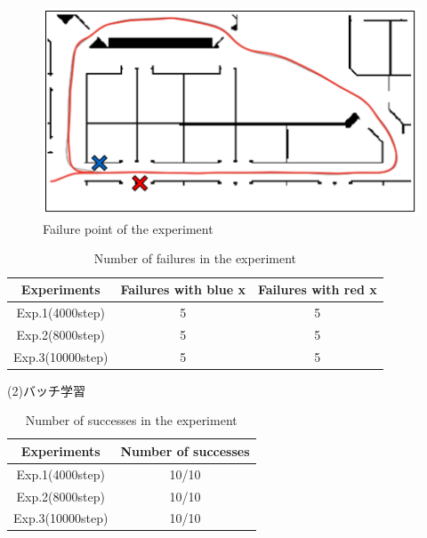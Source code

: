 \begin{figure}[h]
  \centering
  \includegraphics[keepaspectratio, scale=0.5]{images/result2.png}
  \caption{Failure point of the experiment}
  \label{Fig:result2.1}
  \end{figure}

\begin{table}[h]
  \centering
  \begin{tabular}{|c|c|c|} \hline
    Experiments & Failures with blue x & Failures with red x \\ \hline
    Exp.1(4000step) & 5 & 5 \\ \hline
    Exp.2(8000step) & 5 & 5 \\ \hline
    Exp.3(10000step) & 5 & 5 \\ \hline
  \end{tabular}
  \caption{Number of failures in the experiment}
  \label{tb:fail2.1}
\end{table}

\newpage
\begin{description}
  \item [(2)バッチ学習]
\end{description}
\begin{table}[h]
  \centering
  \begin{tabular}{|c|c|} \hline
    Experiments & Number of successes \\ \hline
    Exp.1(4000step) & 10/10 \\ \hline
    Exp.2(8000step) & 10/10 \\ \hline
    Exp.3(10000step) & 10/10 \\ \hline
  \end{tabular}
  \caption{Number of successes in the experiment}
  \label{tb:exp2.2}
\end{table}

